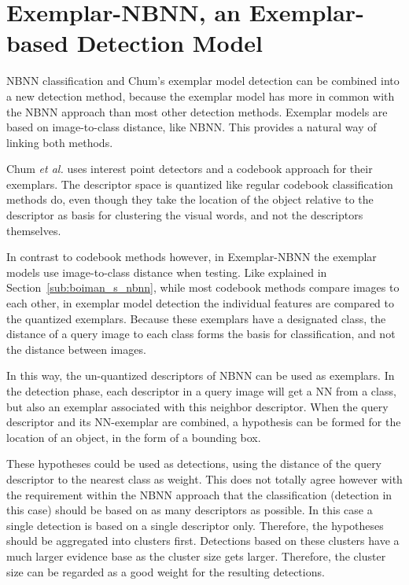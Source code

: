 
\chapter{Exemplar-NBNN, an Exemplar-based Detection Model} %
\label{cha:linking}

NBNN classification and Chum's exemplar model detection \cite{chum2007exemplar} can be combined into a new detection method, because the exemplar model has more in common with the NBNN approach than most other detection methods. Exemplar models are based on image-to-class distance, like NBNN. This provides a natural way of linking both methods.

Chum \emph{et al.} \cite{chum2007exemplar} uses interest point detectors and a codebook approach for their exemplars. The descriptor space is quantized like regular codebook classification methods do, even though they take the location of the object relative to the descriptor as basis for clustering the visual words, and not the descriptors themselves.

In contrast to codebook methods however, in Exemplar-NBNN the exemplar models use image-to-class distance when testing. Like explained in Section~\ref{sub:boiman_s_nbnn}, while most codebook methods compare images to each other, in exemplar model detection the individual features are compared to the quantized exemplars. Because these exemplars have a designated class, the distance of a query image to each class forms the basis for classification, and not the distance between images.

In this way, the un-quantized descriptors of NBNN can be used as exemplars. In the detection phase, each descriptor in a query image will get a NN from a class, but also an exemplar associated with this neighbor descriptor. When the query descriptor and its NN-exemplar are combined, a hypothesis can be formed for the location of an object, in the form of a bounding box.

These hypotheses could be used as detections, using the distance of the query descriptor to the nearest class as weight. This does not totally agree however with the requirement within the NBNN approach that the classification (detection in this case) should be based on as many descriptors as possible. In this case a single detection is based on a single descriptor only. Therefore, the hypotheses should be aggregated into clusters first. Detections based on these clusters have a much larger evidence base as the cluster size gets larger. Therefore, the cluster size can be regarded as a good weight for the resulting detections.

